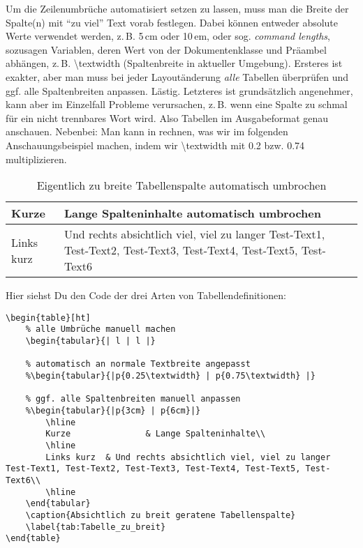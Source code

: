 Um die Zeilenumbrüche automatisiert setzen zu lassen, muss man die Breite der Spalte(n) mit \enquote{zu viel} Text vorab festlegen. Dabei können entweder absolute Werte verwendet werden, z.\,B. 5\,cm oder 10\,em, oder sog. \textit{command lengths}, sozusagen Variablen, deren Wert von der Dokumentenklasse und Präambel abhängen, z.\,B. \textbackslash textwidth (Spaltenbreite in aktueller Umgebung). Ersteres ist exakter, aber man muss bei jeder Layoutänderung \textit{alle} Tabellen überprüfen und ggf. alle Spaltenbreiten anpassen. Lästig. Letzteres ist grundsätzlich angenehmer, kann aber im Einzelfall Probleme verursachen, z.\,B. wenn eine Spalte zu schmal für ein nicht trennbares Wort wird. Also Tabellen im Ausgabeformat genau anschauen. Nebenbei: Man kann in \DMLLaTeX{} rechnen, was wir im folgenden Anschauungsbeispiel machen, indem wir \textbackslash textwidth mit 0.2 bzw. 0.74 multiplizieren.

\begin{table}[ht]		
		\begin{tabular}{|p{} | p{} |}  
			\hline
			Kurze				& Lange Spalteninhalte automatisch umbrochen\\
			\hline
			Links kurz	&Und rechts absichtlich viel, viel zu langer Test-Text1, Test-Text2, Test-Text3, Test-Text4, Test-Text5, Test-Text6\\
			\hline
		\end{tabular}
	\caption{Eigentlich zu breite Tabellenspalte automatisch umbrochen}
	\label{tab:Tabelle_zu_breit_automatisch}
\end{table}

Hier siehst Du den Code der drei Arten von Tabellendefinitionen:
\begin{lstlisting}
\begin{table}[ht]	
	% alle Umbrüche manuell machen
	\begin{tabular}{| l | l |}

	% automatisch an normale Textbreite angepasst
	%\begin{tabular}{|p{0.25\textwidth} | p{0.75\textwidth} |} 

	% ggf. alle Spaltenbreiten manuell anpassen	  
	%\begin{tabular}{|p{3cm} | p{6cm}|} 
		\hline
		Kurze				& Lange Spalteninhalte\\
		\hline
		Links kurz	& Und rechts absichtlich viel, viel zu langer Test-Text1, Test-Text2, Test-Text3, Test-Text4, Test-Text5, Test-Text6\\
		\hline			
	\end{tabular}
	\caption{Absichtlich zu breit geratene Tabellenspalte}
	\label{tab:Tabelle_zu_breit}
\end{table}
\end{lstlisting}

